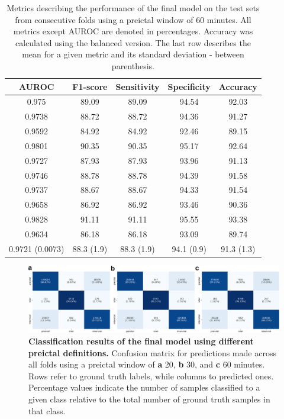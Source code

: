 \documentclass[a4paper,fleqn]{cas-sc}
\begin{document}
\begin{table}[h]
    \centering
    \begin{tabular}{c|c|c|c|c}    
        AUROC & F1-score & Sensitivity & Specificity & Accuracy \\
        \hline
        \hline
        0.975 & 89.09 & 89.09 & 94.54 & 92.03 \\
        0.9738 & 88.72 & 88.72 & 94.36 & 91.27 \\
        0.9592 & 84.92 & 84.92 & 92.46 & 89.15 \\
        0.9801 & 90.35 & 90.35 & 95.17 & 92.64 \\
        0.9727 & 87.93 & 87.93 & 93.96 & 91.13 \\
        0.9746 & 88.78 & 88.78 & 94.39 & 91.58 \\
        0.9737 & 88.67 & 88.67 & 94.33 & 91.54 \\
        0.9658 & 86.92 & 86.92 & 93.46 & 90.36 \\
        0.9828 & 91.11 & 91.11 & 95.55 & 93.38 \\
        0.9634 & 86.18 & 86.18 & 93.09 & 89.74 \\
        \hline
        0.9721 (0.0073) & 88.3 (1.9) & 88.3 (1.9) & 94.1 (0.9) & 91.3 (1.3) \\
        \hline
    \end{tabular}
\caption{Metrics describing the performance of the final model on the test sets from consecutive folds using a preictal window of 60 minutes. All metrics except AUROC are denoted in percentages. Accuracy was calculated using the balanced version. The last row describes the mean for a given metric and its standard deviation - between parenthesis.}
\label{tab:numbers_3600}
\end{table}

\begin{figure}[h]
    \centering
    \includegraphics[width=\linewidth]{figures/conf-lookbacks_grouped.pdf}
    \caption{\textbf{Classification results of the final model using different preictal definitions.} Confusion matrix for predictions made across all folds using a preictal window of \textbf{a} 20, \textbf{b} 30, and \textbf{c} 60 minutes. Rows refer to ground truth labels, while columns to predicted ones. Percentage values indicate the number of samples classified to a given class relative to the total number of ground truth samples in that class.}
    \label{figs2:confusion_lookbacks}
\end{figure}
\end{document}
